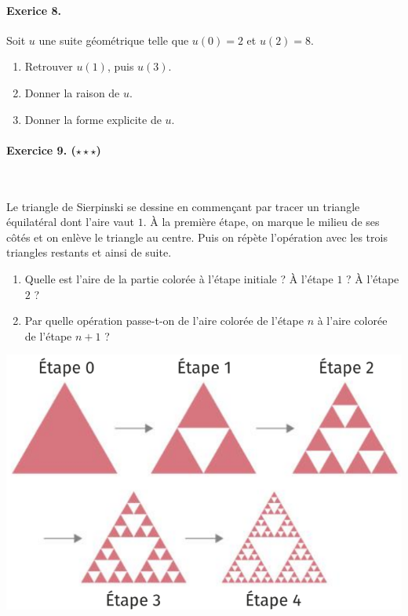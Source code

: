 \documentclass[11pt]{article}
\begin{document}
\paragraph{Exerice 8.} Soit $u$ une suite géométrique telle que $u(0)=2$ et
$u(2)=8$.
\begin{enumerate}
  \item Retrouver $u(1)$, puis $u(3)$.
  \item Donner la raison de $u$.
  \item Donner la forme explicite de $u$.
\end{enumerate}

\paragraph{Exercice 9. ($\star\star\star$)}~\\[2mm]
\begin{minipage}{.5\textwidth}
  Le triangle de Sierpinski se dessine en commençant par tracer un triangle
  équilatéral dont l'aire vaut $1$. À la première étape, on marque le milieu de
  ses côtés et on enlève le triangle au centre. Puis on répète l'opération avec
  les trois triangles restants et ainsi de suite.
  \begin{enumerate}
    \item Quelle est l'aire de la partie colorée à l'étape initiale ? À l'étape
      $1$ ? À l'étape $2$ ?
    \item Par quelle opération passe-t-on de l'aire colorée de l'étape $n$ à
      l'aire colorée de l'étape $n+1$ ?
  \end{enumerate}
\end{minipage}
\begin{minipage}{.5\textwidth}
  \begin{center}
\includegraphics[scale=.35]{sierpinski.png}
  \end{center}
\end{minipage}\\[2mm]
\end{document}
